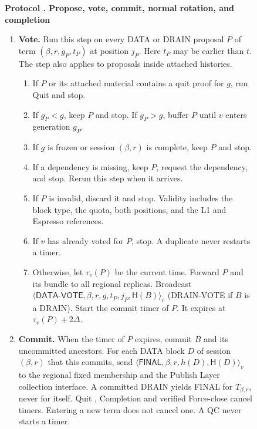 \documentclass[11pt,a4paper]{article}
\newcommand{\RR}[1]{{\color{rrRed}#1}}
\newcommand{\Hash}{\mathsf H}
\newcommand{\tagg}[1]{\ensuremath{\mathsf{#1}}}
\newcounter{protocol}
\newenvironment{protocol}[3][htbp]{\begin{figure}[#1]\refstepcounter{protocol}\label{#2}
\begin{mdframed}[linewidth=.6pt,skipabove=0pt,skipbelow=0pt,
innertopmargin=7pt,innerbottommargin=7pt]\small
\textbf{Protocol \theprotocol. #3}\par\smallskip}{\end{mdframed}\end{figure}}
\begin{document}
\begin{protocol}{alg:steady}{Propose, vote, commit, normal rotation\RR{, and completion}}
\begin{enumerate}[label=\textbf{\arabic*)},itemsep=3pt]
\item \textbf{Vote.} Run this step on every DATA \RR{or DRAIN} proposal
$P$ of term $(\beta,r,g_P,t_P)$ at position $j_P$. Here $t_P$ may be earlier
than $t$. The step also applies to proposals inside attached histories.
 \begin{enumerate}[label=(\alph*)]
 \item If $P$ or its attached material contains a quit proof for $g$,
       run Quit and stop.
 \item If $g_P<g$, keep $P$ and stop. If $g_P>g$, buffer $P$
       until $v$ enters generation $g_P$.
 \item If $g$ is frozen \RR{or session $(\beta,r)$ is complete}, keep $P$ and
       stop.
 \item If a dependency is missing, keep $P$, request the dependency,
       and stop. Rerun this step when it arrives.
 \item If $P$ is invalid, discard it and stop. \RR{Validity includes the
       block type, the quota, both positions, and the L1 and Espresso references.}
 \item If $v$ has already voted for $P$, stop.
       A duplicate never restarts a timer.
 \item Otherwise, let $\tau_v(P)$ be the current time. Forward $P$ and
       its bundle to all \RR{regional replicas. }
       Broadcast
       $\langle\tagg{DATA\mbox{-}VOTE},\beta,r,g,t_P,j_P,\Hash(B)\rangle_v$
       \RR{(DRAIN-VOTE if $B$ is a DRAIN)}.
       Start the commit timer of $P$. It expires at $\tau_v(P)+2\Delta$.
 \end{enumerate}

\item \textbf{Commit.} When the timer of $P$ expires, commit $B$ and
its uncommitted ancestors. \RR{For each DATA block $D$ of session $(\beta,r)$
that this commits, send
$\langle\tagg{FINAL},\beta,r,h(D),\Hash(D)\rangle_v$ to the regional fixed membership and the Publish Layer collection interface. A committed DRAIN yields FINAL for $T_{\beta,r}$, never for
itself. } Quit \RR{, Completion and verified Force-close} cancel timers.
Entering a new term does not cancel one. A QC never starts a timer.


\end{enumerate}
\end{protocol}
\end{document}
